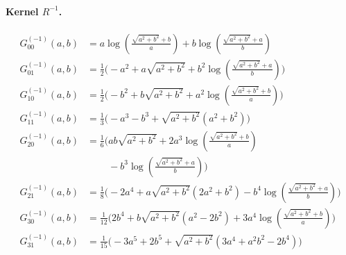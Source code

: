 \paragraph{Kernel $R^{-1}$.}
\begin{align*}
G^{(-1)}_{00}(a,b) &= a \log\left(\frac{\sqrt{a^{2} + b^{2}} + b}{a}\right) + b \log\left(\frac{\sqrt{a^{2} + b^{2}} + a}{b}\right)\\[1.2ex]
G^{(-1)}_{01}(a,b) &= \frac{1}{2}\Bigg(- a^{2} + a \sqrt{a^{2} + b^{2}} + b^{2} \log\left(\frac{\sqrt{a^{2} + b^{2}} + a}{b}\right)\Bigg)\\[1.2ex]
G^{(-1)}_{10}(a,b) &= \frac{1}{2}\Bigg(- b^{2} + b \sqrt{a^{2} + b^{2}} + a^{2} \log\left(\frac{\sqrt{a^{2} + b^{2}} + b}{a}\right)\Bigg)\\[1.2ex]
G^{(-1)}_{11}(a,b) &= \frac{1}{3}\Bigg(- a^{3} - b^{3} + \sqrt{a^{2} + b^{2}}\left(a^{2} + b^{2}\right)\Bigg)\\[1.2ex]
G^{(-1)}_{20}(a,b) &= \frac{1}{6}\Bigg(a b \sqrt{a^{2} + b^{2}} + 2 a^{3} \log\left(\frac{\sqrt{a^{2} + b^{2}} + b}{a}\right)\\
&\phantom{{}=\frac{1}{6}\Bigg(}- b^{3} \log\left(\frac{\sqrt{a^{2} + b^{2}} + a}{b}\right)\Bigg)\\[1.2ex]
G^{(-1)}_{21}(a,b) &= \frac{1}{8}\Bigg(- 2 a^{4} + a \sqrt{a^{2} + b^{2}}\left(2 a^{2} + b^{2}\right) - b^{4} \log\left(\frac{\sqrt{a^{2} + b^{2}} + a}{b}\right)\Bigg)\\[1.2ex]
G^{(-1)}_{30}(a,b) &= \frac{1}{12}\Bigg(2 b^{4} + b \sqrt{a^{2} + b^{2}}\left(a^{2} - 2 b^{2}\right) + 3 a^{4} \log\left(\frac{\sqrt{a^{2} + b^{2}} + b}{a}\right)\Bigg)\\[1.2ex]
G^{(-1)}_{31}(a,b) &= \frac{1}{15}\Bigg(- 3 a^{5} + 2 b^{5} + \sqrt{a^{2} + b^{2}}\left(3 a^{4} + a^{2} b^{2} - 2 b^{4}\right)\Bigg)
\end{align*}
